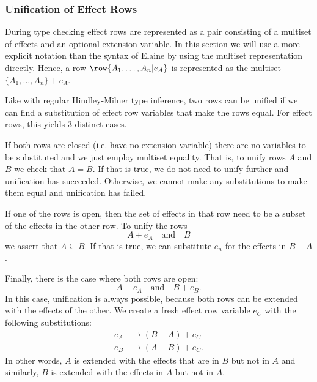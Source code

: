 \subsubsection{Unification of Effect Rows}


During type checking effect rows are represented as a pair consisting of a multiset of effects and an optional extension variable. In this section we will use a more explicit notation than the syntax of Elaine by using the multiset representation directly. Hence, a row $\row{A_1,\dots,A_n|e_A}$ is represented as the multiset $\{A_1,\dots,A_n\} + e_A$.

Like with regular Hindley-Milner type inference, two rows can be unified if we can find a substitution of effect row variables that make the rows equal. For effect rows, this yields 3 distinct cases.

If both rows are closed (i.e. have no extension variable) there are no variables to be substituted and we just employ multiset equality. That is, to unify rows $A$ and $B$ we check that $A = B$. If that is true, we do not need to unify further and unification has succeeded. Otherwise, we cannot make any substitutions to make them equal and unification has failed.

If one of the rows is open, then the set of effects in that row need to be a subset of the effects in the other row. To unify the rows
\[ A + e_A \quad\text{and}\quad B \]
we assert that $A \subseteq B$. If that is true, we can substitute $e_n$ for the effects in $B - A$.

Finally, there is the case where both rows are open:
\[ A + e_A \quad\text{and}\quad B + e_B. \]
In this case, unification is always possible, because both rows can be extended with the effects of the other. We create a fresh effect row variable $e_C$ with the following substitutions:
\begin{align*}
    e_A &\to (B - A) + e_C \\
    e_B &\to (A - B) + e_C.
\end{align*}
In other words, $A$ is extended with the effects that are in $B$ but not in $A$ and similarly, $B$ is extended with the effects in $A$ but not in $A$.
